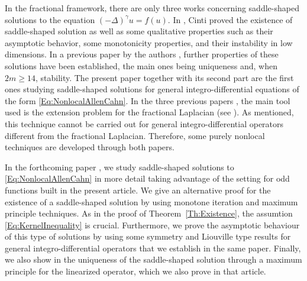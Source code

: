 \documentclass[12pt,reqno]{amsart}
\theoremstyle{definition}
\theoremstyle{remark}
\newcommand{\s}{\gamma}
\newcommand{\fraclaplacian}{(-\Delta)^\s}
\numberwithin{equation}{section}
\begin{document}
In the fractional framework, there are only three works concerning saddle-shaped solutions to the equation $\fraclaplacian u = f(u)$. In \cite{Cinti-Saddle,Cinti-Saddle2}, Cinti proved the existence of saddle-shaped solution as well as some qualitative properties such as their asymptotic behavior, some monotonicity properties, and their instability in low dimensions. In a previous paper by the authors \cite{Felipe-Sanz-Perela:SaddleFractional}, further properties of these solutions have been established, the main ones being uniqueness and, when $2m\geq 14$, stability. The present paper together with its second part \cite{FelipeSanz-Perela:IntegroDifferentialII} are the first ones studying saddle-shaped solutions for general integro-differential equations of the form \eqref{Eq:NonlocalAllenCahn}. In the three previous papers \cite{Cinti-Saddle, Cinti-Saddle2, Felipe-Sanz-Perela:SaddleFractional}, the main tool used is the extension problem for the fractional Laplacian (see \cite{CaffarelliSilvestre}). As mentioned, this technique cannot be carried out for general integro-differential operators different from the fractional Laplacian. Therefore, some purely nonlocal techniques are developed through both papers.

In the forthcoming paper \cite{FelipeSanz-Perela:IntegroDifferentialII}, we study saddle-shaped solutions to \eqref{Eq:NonlocalAllenCahn} in more detail taking advantage of the setting for odd functions built in the present article. We give an alternative proof for the existence of a saddle-shaped solution by using monotone iteration and maximum principle techniques. As in the proof of Theorem~\ref{Th:Existence}, the assumtion \eqref{Eq:KernelInequality} is crucial. Furthermore, we prove the asymptotic behaviour of this type of solutions by using some symmetry and Liouville type results for general integro-differential operators that we establish in the same paper. Finally, we also show in \cite{FelipeSanz-Perela:IntegroDifferentialII} the uniqueness of the saddle-shaped solution through a maximum principle for the linearized operator, which we also prove in that article.
\end{document}
